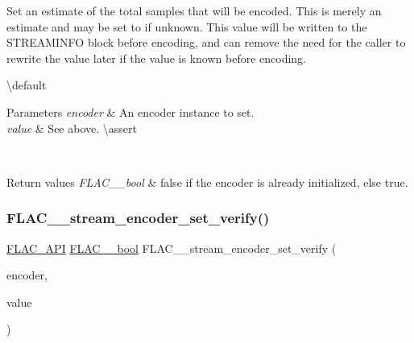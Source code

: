 Set an estimate of the total samples that will be encoded. This is merely an estimate and may be set to {} if unknown. This value will be written to the S\+T\+R\+E\+A\+M\+I\+N\+FO block before encoding, and can remove the need for the caller to rewrite the value later if the value is known before encoding.

\textbackslash{}default {} 
\begin{DoxyParams}{Parameters}
{\em encoder} & An encoder instance to set. \\
\hline
{\em value} & See above. \textbackslash{}assert 
\begin{DoxyCode}{1}
\end{DoxyCode}
 \\
\hline
\end{DoxyParams}

\begin{DoxyRetVals}{Return values}
{\em F\+L\+A\+C\+\_\+\+\_\+bool} & {\ttfamily false} if the encoder is already initialized, else {\ttfamily true}. \\
\hline
\end{DoxyRetVals}
\mbox{\label{group__flac__stream__encoder_ga5f4ac18a7207d2864fed72d284486f9e}} 
\subsubsection{\texorpdfstring{FLAC\_\_stream\_encoder\_set\_verify()}{FLAC\_\_stream\_encoder\_set\_verify()}}
{\footnotesize\ttfamily \mbox{\hyperlink{group__flac__export_ga56ca07df8a23310707732b1c0007d6f5}{F\+L\+A\+C\+\_\+\+A\+PI}} \mbox{\hyperlink{ordinals_8h_a95103469f1cbd78b8cf250194985b34e}{F\+L\+A\+C\+\_\+\+\_\+bool}} F\+L\+A\+C\+\_\+\+\_\+stream\+\_\+encoder\+\_\+set\+\_\+verify (\begin{DoxyParamCaption}\item[{\mbox{\hyperlink{struct_f_l_a_c_____stream_encoder}{F\+L\+A\+C\+\_\+\+\_\+\+Stream\+Encoder}} $\ast$}]{encoder,  }\item[{\mbox{\hyperlink{ordinals_8h_a95103469f1cbd78b8cf250194985b34e}{F\+L\+A\+C\+\_\+\+\_\+bool}}}]{value }\end{DoxyParamCaption})}

